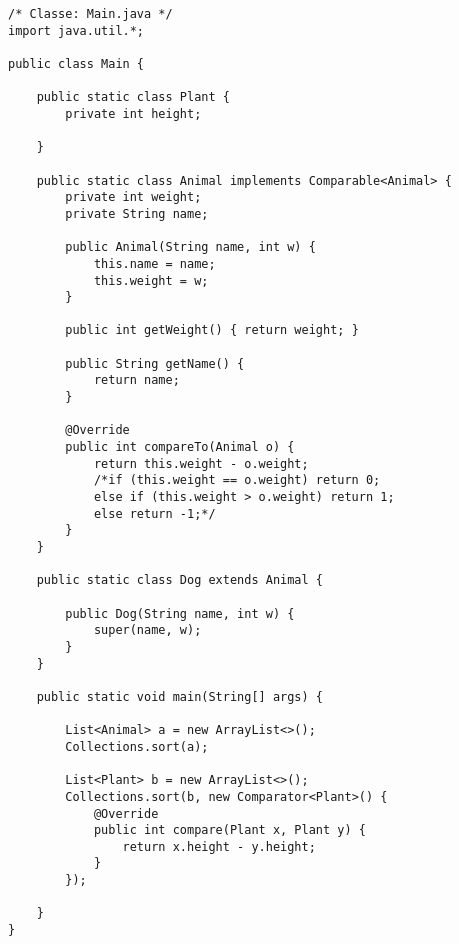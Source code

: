 \begin{lstlisting}[basicstyle=\small,]
/* Classe: Main.java */
import java.util.*;

public class Main {

    public static class Plant {
        private int height;

    }

    public static class Animal implements Comparable<Animal> {
        private int weight;
        private String name;

        public Animal(String name, int w) {
            this.name = name;
            this.weight = w;
        }

        public int getWeight() { return weight; }

        public String getName() {
            return name;
        }

        @Override
        public int compareTo(Animal o) {
            return this.weight - o.weight;
            /*if (this.weight == o.weight) return 0;
            else if (this.weight > o.weight) return 1;
            else return -1;*/
        }
    }

    public static class Dog extends Animal {

        public Dog(String name, int w) {
            super(name, w);
        }
    }

    public static void main(String[] args) {

        List<Animal> a = new ArrayList<>();
        Collections.sort(a);

        List<Plant> b = new ArrayList<>();
        Collections.sort(b, new Comparator<Plant>() {
            @Override
            public int compare(Plant x, Plant y) {
                return x.height - y.height;
            }
        });

    }
}
\end{lstlisting}